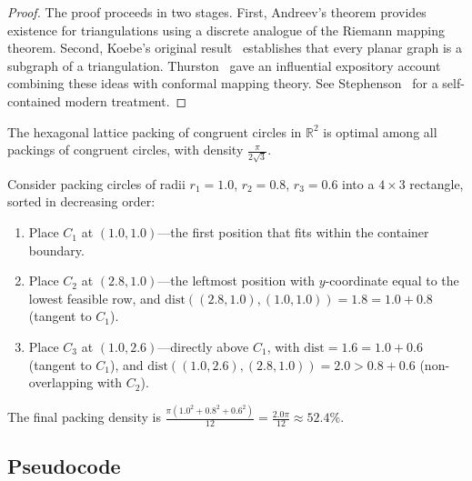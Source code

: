 \begin{proof}
The proof proceeds in two stages. First, Andreev's theorem provides existence for triangulations using a discrete analogue of the Riemann mapping theorem. Second, Koebe's original result~\cite{koebe1936} establishes that every planar graph is a subgraph of a triangulation. Thurston~\cite{thurston1985} gave an influential expository account combining these ideas with conformal mapping theory. See Stephenson~\cite[Chapter~3]{stephenson2005} for a self-contained modern treatment.
\end{proof}

\begin{corollary}\label{cor:hexagonal_optimal}
The hexagonal lattice packing of congruent circles in $\mathbb{R}^2$ is optimal among all packings of congruent circles, with density $\frac{\pi}{2\sqrt{3}}$.
\end{corollary}



\begin{example}\label{ex:greedy_circle}
Consider packing circles of radii $r_1 = 1.0$, $r_2 = 0.8$, $r_3 = 0.6$ into a $4 \times 3$ rectangle, sorted in decreasing order:
\begin{enumerate}
    \item Place $C_1$ at $(1.0, 1.0)$---the first position that fits within the container boundary.
    \item Place $C_2$ at $(2.8, 1.0)$---the leftmost position with $y$-coordinate equal to the lowest feasible row, and $\text{dist}((2.8,1.0),(1.0,1.0)) = 1.8 = 1.0 + 0.8$ (tangent to $C_1$).
    \item Place $C_3$ at $(1.0, 2.6)$---directly above $C_1$, with $\text{dist} = 1.6 = 1.0 + 0.6$ (tangent to $C_1$), and $\text{dist}((1.0,2.6),(2.8,1.0)) = 2.0 > 0.8 + 0.6$ (non-overlapping with $C_2$).
\end{enumerate}
The final packing density is $\frac{\pi(1.0^2 + 0.8^2 + 0.6^2)}{12} = \frac{2.0\pi}{12} \approx 52.4\%$.
\end{example}

\subsection{Pseudocode}

